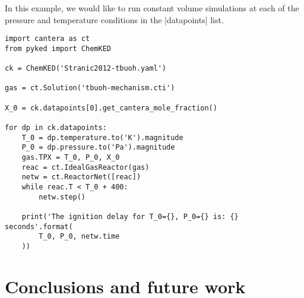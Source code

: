 \documentclass[12pt]{ussci}
\begin{document}
In this example, we would like to run constant volume simulations at each of the
pressure and temperature conditions in the \yaml|datapoints| list.

\begin{verbatim}
import cantera as ct
from pyked import ChemKED

ck = ChemKED('Stranic2012-tbuoh.yaml')

gas = ct.Solution('tbuoh-mechanism.cti')

X_0 = ck.datapoints[0].get_cantera_mole_fraction()

for dp in ck.datapoints:
    T_0 = dp.temperature.to('K').magnitude
    P_0 = dp.pressure.to('Pa').magnitude
    gas.TPX = T_0, P_0, X_0
    reac = ct.IdealGasReactor(gas)
    netw = ct.ReactorNet([reac])
    while reac.T < T_0 + 400:
        netw.step()

    print('The ignition delay for T_0={}, P_0={} is: {} seconds'.format(
        T_0, P_0, netw.time
    ))
\end{verbatim}
\section{Conclusions and future work}
%

\printbibliography
\end{document}
